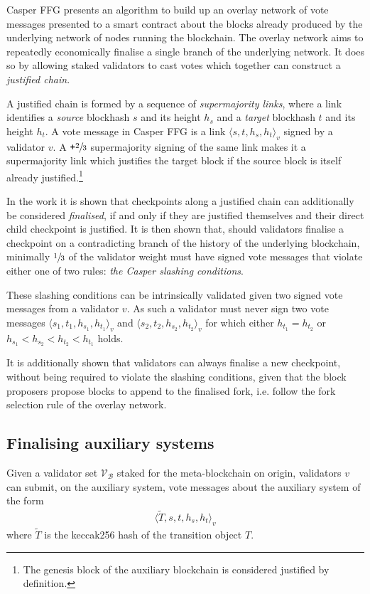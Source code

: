 \documentclass[12pt,a4paper]{article}
\begin{document}
Casper FFG presents an algorithm to build up an overlay network of vote messages presented to a smart contract about the blocks already produced by the underlying network of nodes running the blockchain.
The overlay network aims to repeatedly economically finalise a single branch of the underlying network.
It does so by allowing staked validators to cast votes which together can construct a \emph{justified chain}.

A justified chain is formed by a sequence of \emph{supermajority links}, where a link identifies a \emph{source} blockhash $s$ and its height $h_s$ and a \emph{target} blockhash $t$ and its height $h_t$.
A vote message in Casper FFG is a link $\langle s, t, h_s, h_t\rangle_v$ signed by a validator $v$.
A $\texttt{+}\sfrac{2}{3}$ supermajority signing of the same link makes it a supermajority link which justifies the target block if the source block is itself already justified.\footnote{
	The genesis block of the auxiliary blockchain is considered justified by definition.
}

In the work it is shown that checkpoints along a justified chain can additionally be considered \emph{finalised}, if and only if they are justified themselves and their direct child checkpoint is justified.
It is then shown that, should validators finalise a checkpoint on a contradicting branch of the history of the underlying blockchain, minimally $\sfrac{1}{3}$ of the validator weight must have signed vote messages that violate either one of two rules: \emph{the Casper slashing conditions}.

These slashing conditions can be intrinsically validated given two signed vote messages from a validator $v$.
As such a validator must never sign two vote messages $\langle s_1, t_1, h_{s_1}, h_{t_1}\rangle_v$ and $\langle s_2, t_2, h_{s_2}, h_{t_2}\rangle_v$ for which either $h_{t_1} = h_{t_2}$ or $h_{s_1} < h_{s_2} < h_{t_2} < h_{t_1}$ holds.

It is additionally shown that validators can always finalise a new checkpoint, without being required to violate the slashing conditions, given that the block proposers propose blocks to append to the finalised fork, i.e. follow the fork selection rule of the overlay network.

\subsection{Finalising auxiliary systems}
Given a validator set $\mathcal{V}_\mathcal{B}$ staked for the meta-blockchain on origin, validators $v$ can submit, on the auxiliary system, vote messages about the auxiliary system of the form
\begin{align}\label{externalisedvote}
  \langle \tilde{T}, s, t, h_s, h_t \rangle_v
\end{align}
where $\tilde{T}$ is the keccak256 hash of the transition object $T$.
\end{document}
